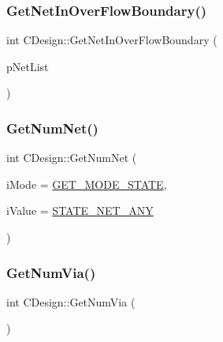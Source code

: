 \subsubsection{\texorpdfstring{GetNetInOverFlowBoundary()}{GetNetInOverFlowBoundary()}}
{\footnotesize\ttfamily int C\+Design\+::\+Get\+Net\+In\+Over\+Flow\+Boundary (\begin{DoxyParamCaption}\item[{hash\+\_\+map$<$ \mbox{\hyperlink{BoxRouter_8h_a280feb883e9d4a7edcc69c8bcb9f38f2}{A\+D\+D\+R\+E\+SS}}, int $>$ $\ast$}]{p\+Net\+List }\end{DoxyParamCaption})}

\mbox{\label{classCDesign_ac4221f754cb8ba12ac6344df3ca31d26}} 
\subsubsection{\texorpdfstring{GetNumNet()}{GetNumNet()}}
{\footnotesize\ttfamily int C\+Design\+::\+Get\+Num\+Net (\begin{DoxyParamCaption}\item[{int}]{i\+Mode = {\ttfamily \mbox{\hyperlink{BoxRouter_8h_a6f72f2cc9dd31793dd832ccfb2547de4}{G\+E\+T\+\_\+\+M\+O\+D\+E\+\_\+\+S\+T\+A\+TE}}},  }\item[{int}]{i\+Value = {\ttfamily \mbox{\hyperlink{BoxRouter_8h_a048013954c49608419bca2bcccad5b17}{S\+T\+A\+T\+E\+\_\+\+N\+E\+T\+\_\+\+A\+NY}}} }\end{DoxyParamCaption})}

\mbox{\label{classCDesign_a28c4e077c911fbe9259d3ade4b91898d}} 
\subsubsection{\texorpdfstring{GetNumVia()}{GetNumVia()}}
{\footnotesize\ttfamily int C\+Design\+::\+Get\+Num\+Via (\begin{DoxyParamCaption}{ }\end{DoxyParamCaption})}

\mbox{\label{classCDesign_a8a75e3e7df767d33c08f31076570ecb8}} 

